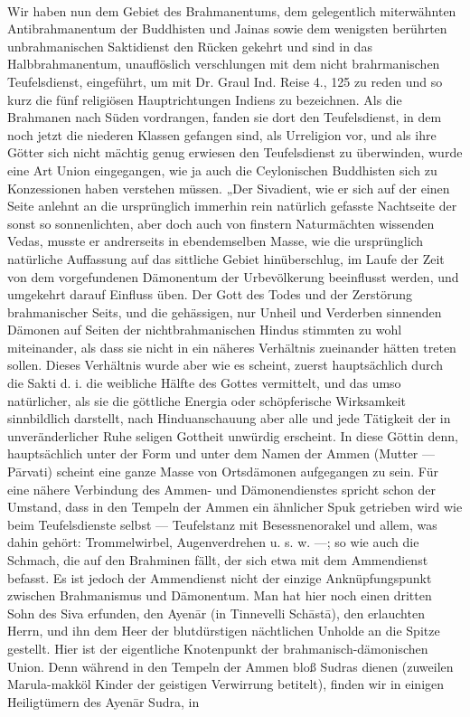 \documentclass{article}
\begin{document}
\begin{center}
\end{center}
\paragraph{}
Wir haben nun dem Gebiet des Brahmanentums, dem gelegentlich miterwähnten Antibrahmanentum der Buddhisten und Jainas sowie dem wenigsten berührten unbrahmanischen Saktidienst den Rücken gekehrt und sind in das Halbbrahmanentum, unauflöslich verschlungen mit dem nicht brahrmanischen Teufelsdienst, eingeführt, um mit Dr. Graul Ind. Reise 4., 125 zu reden und so kurz die fünf religiösen Hauptrichtungen Indiens zu bezeichnen. Als die Brahmanen nach Süden vordrangen, fanden sie dort den Teufelsdienst, in dem noch jetzt die niederen Klassen gefangen sind, als Urreligion vor, und als ihre Götter sich nicht mächtig genug erwiesen den Teufelsdienst zu überwinden, wurde eine Art Union eingegangen, wie ja auch die Ceylonischen Buddhisten sich zu Konzessionen haben verstehen müssen. „Der Sivadient, wie er sich auf der einen Seite anlehnt an die ursprünglich immerhin rein natürlich gefasste Nachtseite der sonst so sonnenlichten, aber doch auch von finstern Naturmächten wissenden Vedas, musste er andrerseits in ebendemselben Masse, wie die ursprünglich natürliche Auffassung auf das sittliche Gebiet hinüberschlug, im Laufe der Zeit von dem vorgefundenen Dämonentum der Urbevölkerung beeinflusst werden, und umgekehrt darauf Einfluss üben. Der Gott des Todes und der Zerstörung brahmanischer Seits, und die gehässigen, nur Unheil und Verderben sinnenden Dämonen auf Seiten der nichtbrahmanischen Hindus stimmten zu wohl miteinander, als dass sie nicht in ein näheres Verhältnis zueinander hätten treten sollen. Dieses Verhältnis wurde aber wie es scheint, zuerst hauptsächlich durch die Sakti d. i. die weibliche Hälfte des Gottes vermittelt, und das umso natürlicher, als sie die göttliche Energia oder schöpferische Wirksamkeit sinnbildlich darstellt, nach Hinduanschauung aber alle und jede Tätigkeit der in unveränderlicher Ruhe seligen Gottheit unwürdig erscheint. In diese Göttin denn, hauptsächlich unter der Form und unter dem Namen der Ammen (Mutter — P\={a}rvati) scheint eine ganze Masse von Ortsdämonen aufgegangen zu sein. Für eine nähere Verbindung des Ammen- und Dämonendienstes spricht schon der Umstand, dass in den Tempeln der Ammen ein ähnlicher Spuk getrieben wird wie beim Teufelsdienste selbst — Teufelstanz mit Besessnenorakel und allem, was dahin gehört: Trommelwirbel, Augenverdrehen u. s. w. —; so wie auch die Schmach, die auf den Brahminen fällt, der sich etwa mit dem Ammendienst befasst. Es ist jedoch der Ammendienst nicht der einzige Anknüpfungspunkt zwischen Brahmanismus und Dämonentum. Man hat hier noch einen dritten Sohn des Siva erfunden, den Ayen\={a}r (in Tinnevelli Sch\={a}st\={a}), den erlauchten Herrn, und ihn dem Heer der blutdürstigen nächtlichen Unholde an die Spitze gestellt. Hier ist der eigentliche Knotenpunkt der brahmanisch-dämonischen Union. Denn während in den Tempeln der Ammen bloß Sudras dienen (zuweilen Marula-makköl Kinder der geistigen Verwirrung betitelt), finden wir in einigen Heiligtümern des Ayen\={a}r Sudra, in 
\end{document}
